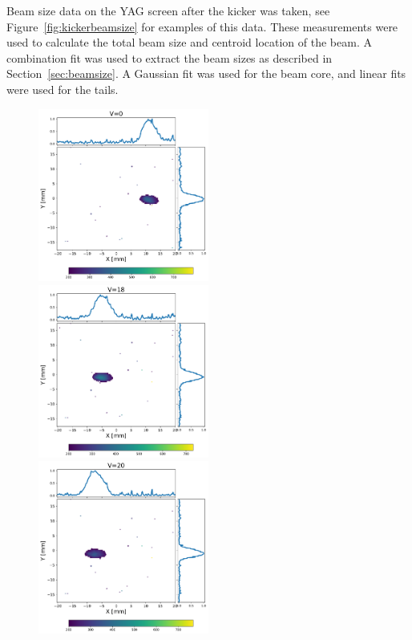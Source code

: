 \documentclass[aps,prab,preprint,groupedaddress,linenumbers]{revtex4-2}
\begin{document}
Beam size data on the YAG screen after the kicker was taken, 
see Figure~\ref{fig:kickerbeamsize} for examples of this data. 
These measurements were used to calculate the total beam size and 
centroid location of the beam. A combination fit was used to extract 
the beam sizes as described in Section~\ref{sec:beamsize}. 
A Gaussian fit was used for the beam core, and linear fits were used for the tails.
\begin{figure}
	\includegraphics[width=0.5\textwidth]{yag6_kicker_voltage0}%
	\includegraphics[width=0.5\textwidth]{yag6_kicker_voltage18}\\
	\includegraphics[width=0.5\textwidth]{yag6_kicker_voltage20}%

\end{figure}
\end{document}
